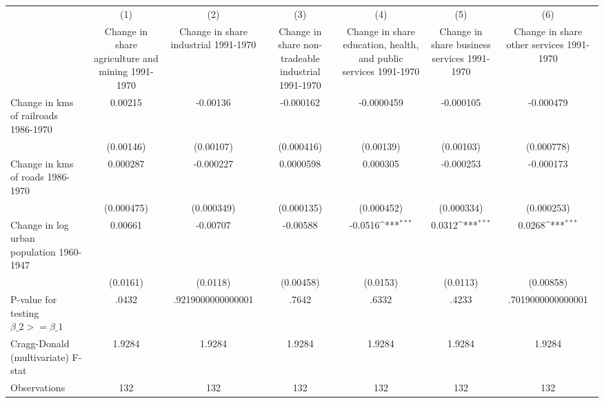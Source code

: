 {
\def\sym#1{\ifmmode^{#1}\else\(^{#1}\)\fi}
\begin{tabular}{l*{6}{c}}
\hline\hline
                &\multicolumn{1}{c}{(1)}&\multicolumn{1}{c}{(2)}&\multicolumn{1}{c}{(3)}&\multicolumn{1}{c}{(4)}&\multicolumn{1}{c}{(5)}&\multicolumn{1}{c}{(6)}\\
                &\multicolumn{1}{c}{Change in share agriculture and mining 1991-1970}&\multicolumn{1}{c}{Change in share industrial 1991-1970}&\multicolumn{1}{c}{Change in share non-tradeable industrial 1991-1970}&\multicolumn{1}{c}{Change in share education, health, and public services 1991-1970}&\multicolumn{1}{c}{Change in share business services 1991-1970}&\multicolumn{1}{c}{Change in share other services 1991-1970}\\
\hline
Change in kms of railroads 1986-1970&  0.00215         & -0.00136         &-0.000162         &-0.0000459         &-0.000105         &-0.000479         \\
                &(0.00146)         &(0.00107)         &(0.000416)         &(0.00139)         &(0.00103)         &(0.000778)         \\
[1em]
Change in kms of roads 1986-1970& 0.000287         &-0.000227         &0.0000598         & 0.000305         &-0.000253         &-0.000173         \\
                &(0.000475)         &(0.000349)         &(0.000135)         &(0.000452)         &(0.000334)         &(0.000253)         \\
[1em]
Change in log urban population 1960-1947&  0.00661         & -0.00707         & -0.00588         &  -0.0516\sym{***}&   0.0312\sym{***}&   0.0268\sym{***}\\
                & (0.0161)         & (0.0118)         &(0.00458)         & (0.0153)         & (0.0113)         &(0.00858)         \\
\hline
P-value for testing $\beta\_{2} >= \beta\_{1}$&    .0432         &.9219000000000001         &    .7642         &    .6332         &    .4233         &.7019000000000001         \\
Cragg-Donald (multivariate) F-stat&   1.9284         &   1.9284         &   1.9284         &   1.9284         &   1.9284         &   1.9284         \\
Observations    &      132         &      132         &      132         &      132         &      132         &      132         \\
\hline\hline
\end{tabular}
}
